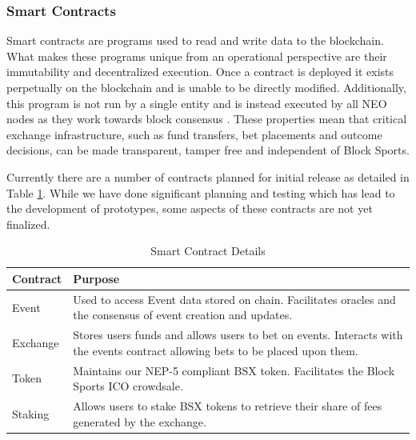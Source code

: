 \documentclass{article}
\begin{document}
		\subsubsection{Smart Contracts} \label{smart-contracts}
Smart contracts are programs used to read and write data to the blockchain. What makes these programs unique from an operational perspective are their immutability and decentralized execution. Once a contract is deployed it exists perpetually on the blockchain and is unable to be directly modified. Additionally, this program is not run by a single entity and is instead executed by all NEO nodes as they work towards block consensus \cite{neo-whitepaper}. These properties mean that critical exchange infrastructure, such as fund transfers, bet placements and outcome decisions, can be made transparent, tamper free and independent of Block Sports.

Currently there are a number of contracts planned for initial release as detailed in Table \ref{table:contracts}. While we have done significant planning and testing which has lead to the development of prototypes, some aspects of these contracts are not yet finalized.

\begin{table}[!htb]
\caption{Smart Contract Details}

\begin{tabularx}{\textwidth}{ p{3cm}  p{8.4cm}}
\bfseries{Contract} & \bfseries{Purpose} \\
\hline

Event & Used to access Event data stored on chain. \newline Facilitates oracles and the consensus of event creation and updates. \\   \hline

Exchange & Stores users funds and allows users to bet on events. \newline Interacts with the events contract allowing bets to be placed upon them. \\   \hline

Token & Maintains our NEP-5 compliant BSX token. \newline Facilitates the Block Sports ICO crowdsale. \\   \hline

Staking & Allows users to stake BSX tokens to retrieve \newline their share of fees generated by the exchange. \\

\hline

\end{tabularx}
\label{table:contracts}
\end{table}
\end{document}
